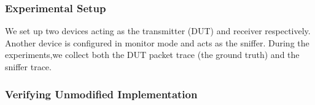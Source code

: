 \vspace*{-3mm}
\subsubsection{Experimental Setup}

We set up two \wifi{} devices acting as the transmitter (DUT) and receiver
respectively. Another \wifi{} device is configured in monitor mode and acts as
the sniffer. During the experiments,we collect both the DUT packet trace
(the ground truth) and the sniffer trace.

\vspace*{-3mm}
\subsubsection{Verifying Unmodified Implementation}

